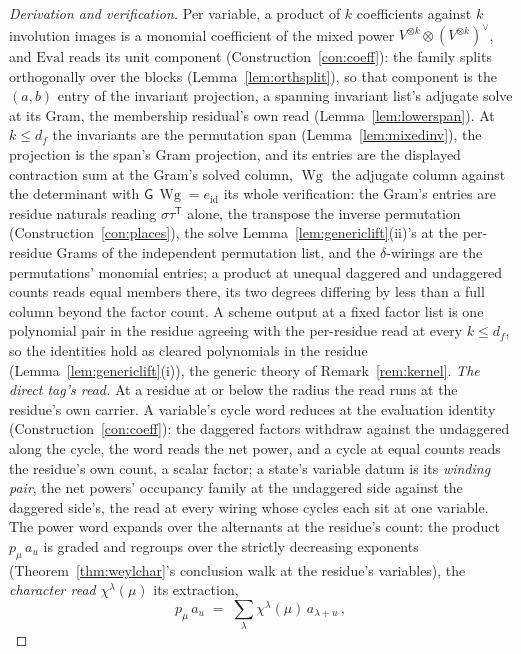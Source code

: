 \documentclass[11pt]{article}
\theoremstyle{definition}
\newcommand{\Wg}{\operatorname{Wg}}
\begin{document}
\begin{proof}[Derivation and verification]
Per variable, a product of $k$ coefficients against $k$ involution images is a
monomial coefficient of the mixed power
$V^{\otimes k}\otimes(V^{\otimes k})^\vee$, and $\mathrm{Eval}$
reads its unit component (Construction~\ref{con:coeff}): the
family splits orthogonally over the blocks
(Lemma~\ref{lem:orthsplit}), so that component is the $(a,b)$
entry of the invariant projection, a spanning invariant list's
adjugate solve at its Gram, the membership residual's own read
(Lemma~\ref{lem:lowerspan}). At
$k\le d_f$ the invariants are the permutation span
(Lemma~\ref{lem:mixedinv}), the projection is the span's Gram
projection, and its entries are the displayed contraction sum at the
Gram's solved column, $\Wg$ the adjugate column against the
determinant with $\mathsf G\,\Wg=e_{\mathrm{id}}$ its whole
verification: the Gram's entries
are residue naturals reading $\sigma\tau^{\mathsf T}$ alone, the
transpose the inverse permutation
(Construction~\ref{con:places}), the solve
Lemma~\ref{lem:genericlift}(ii)'s at the per-residue Grams of
the independent permutation list, and the
$\delta$-wirings are the permutations' monomial entries; a product at unequal daggered and undaggered counts reads equal
members there, its two degrees differing by less than a full
column beyond the factor count. A scheme output at a fixed factor list is one
polynomial pair in the residue agreeing with the per-residue read at every
$k\le d_f$, so the identities hold as cleared polynomials in the
residue
(Lemma~\ref{lem:genericlift}(i)), the generic theory of
Remark~\ref{rem:kernel}. \emph{The direct tag's read.} At a
residue at or below the radius the read runs at the residue's own
carrier. A variable's cycle word reduces at the evaluation
identity (Construction~\ref{con:coeff}): the daggered factors
withdraw against the undaggered along the cycle, the word reads
the net power, and a cycle at equal counts reads the residue's own
count, a scalar factor; a state's variable datum is its
\emph{winding pair}, the net powers' occupancy family at the
undaggered side against the daggered side's, the read at every
wiring whose cycles each sit at one variable. The power word
expands over the alternants at the residue's count: the product
$p_\mu\,a_u$ is graded and regroups over the strictly decreasing
exponents (Theorem~\ref{thm:weylchar}'s conclusion walk at the
residue's variables), the \emph{character read}
$\chi^\lambda(\mu)$ its extraction,
\[
p_\mu\,a_u\;=\;\sum_{\lambda}\chi^\lambda(\mu)\,a_{\lambda+u}\,,
\]

\end{proof}
\end{document}
